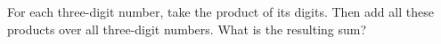 For each three-digit number, take the product of its digits. Then add all these products over all three-digit numbers. What is the resulting sum?
